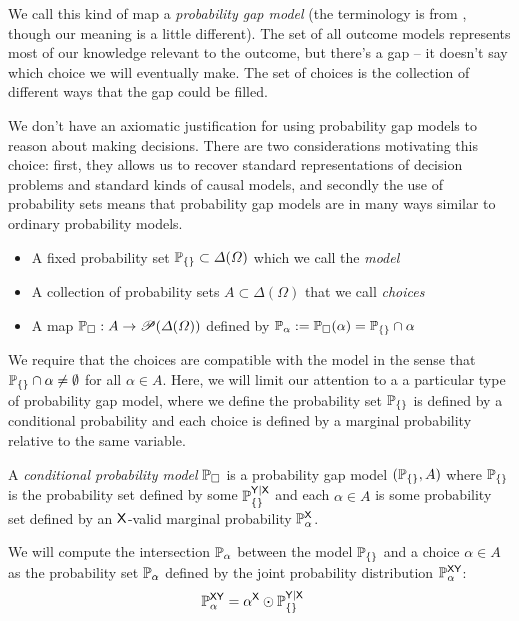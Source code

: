 We call this kind of map a \emph{probability gap model} (the terminology is from \citet{hajek_interpretations_2019}, though our meaning is a little different). The set of all outcome models represents most of our knowledge relevant to the outcome, but there's a gap -- it doesn't say which choice we will eventually make. The set of choices is the collection of different ways that the gap could be filled.

We don't have an axiomatic justification for using probability gap models to reason about making decisions. There are two considerations motivating this choice: first, they allows us to recover standard representations of decision problems and standard kinds of causal models, and secondly the use of probability sets means that probability gap models are in many ways similar to ordinary probability models.

\begin{itemize}
	\item A fixed probability set $\mathbb{P}_{\{\}}\subset \Delta(\Omega)$ which we call the \emph{model}
	\item A collection of probability sets $A\subset \Delta(\Omega)$ that we call \emph{choices}
	\item A map $\mathbb{P}_\square: A\to \mathscr{P}(\Delta(\Omega))$ defined by $\mathbb{P}_\alpha:=\mathbb{P}_\square(\alpha)=\mathbb{P}_{\{\}}\cap\alpha$
\end{itemize}

We require that the choices are compatible with the model in the sense that $\mathbb{P}_{\{\}}\cap\alpha\neq \emptyset$ for all $\alpha\in A$. Here, we will limit our attention to a a particular type of probability gap model, where we define the probability set $\mathbb{P}_{\{\}}$ is defined by a conditional probability and each choice is defined by a marginal probability relative to the same variable.

\begin{definition}\label{def:cprob_model}
A \emph{conditional probability model} $\mathbb{P}_\square$ is a probability gap model $(\mathbb{P}_{\{\}},A)$ where $\mathbb{P}_{\{\}}$ is the probability set defined by some $\mathbb{P}_{\{\}}^{\mathsf{Y}|\mathsf{X}}$ and each $\alpha\in A$ is some probability set defined by an $\mathsf{X}$-valid marginal probability $\mathbb{P}_\alpha^{\mathsf{X}}$.
\end{definition}

We will compute the intersection $\mathbb{P}_\alpha$ between the model $\mathbb{P}_{\{\}}$ and a choice $\alpha\in A$ as the probability set $\mathbb{P}_{\alpha}$ defined by the joint probability distribution $\mathbb{P}_\alpha^{\mathsf{XY}}$:
\begin{align}
	\mathbb{P}_\alpha^{\mathsf{XY}} &= \alpha^{\mathsf{X}}\odot \mathbb{P}_{\{\}}^{\mathsf{Y}|\mathsf{X}}\label{eq:semidirect_intersection}
\end{align}

